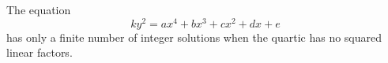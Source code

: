 \begin{proposition}\label{eq:134}
    The equation
\[
    ky^2=ax^4+bx^3+cx^2+dx+e
\]
    has only a finite number of integer solutions when the quartic has no squared linear factors.
\end{proposition}
